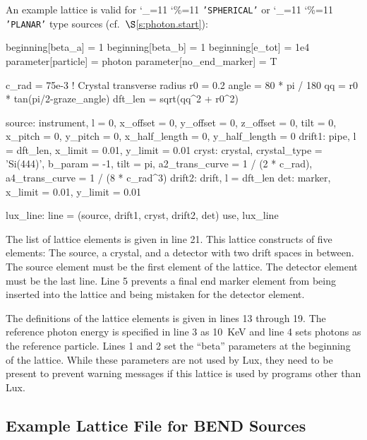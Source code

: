 \documentclass[11pt]{article}
\newcommand{\lux}{Lux\xspace}
\newcommand\ttcmd{\begingroup\catcode`\_=11 \catcode`\%=11 \dottcmd}
\newcommand\dottcmd[1]{\texttt{#1}\endgroup}
\newcommand{\vn}{\ttcmd}
\newcommand{\sref}[1]{$\S$\ref{#1}}
\begin{document}
An example lattice is valid for \vn{'SPHERICAL'} or
\vn{'PLANAR'} type sources (cf.~\sref{s:photon.start}):
\begin{listing}{1}
beginning[beta_a] = 1
beginning[beta_b] = 1
beginning[e_tot] = 1e4
parameter[particle] = photon
parameter[no_end_marker] = T

c_rad = 75e-3  ! Crystal transverse radius 
r0 = 0.2
angle  = 80 * pi / 180
qq = r0 * tan(pi/2-graze_angle)
dft_len = sqrt(qq^2 + r0^2)

source: instrument, l = 0, x_offset = 0, y_offset = 0, z_offset = 0, tilt = 0,
        x_pitch = 0, y_pitch = 0, x_half_length = 0, y_half_length = 0
drift1: pipe, l = dft_len, x_limit = 0.01, y_limit = 0.01
cryst: crystal, crystal_type = 'Si(444)', b_param = -1, tilt = pi, 
        a2_trans_curve = 1 / (2 * c_rad), a4_trans_curve = 1 / (8 * c_rad^3)
drift2: drift, l = dft_len
det: marker, x_limit = 0.01, y_limit = 0.01

lux_line: line = (source, drift1, cryst, drift2, det)
use, lux_line
\end{listing}

The list of lattice elements is given in line 21.  This lattice
constructs of five elements: The source, a crystal, and a detector
with two drift spaces in between. The source element must be the first
element of the lattice. The detector element must be the last
line. Line 5 prevents a final end marker element from being inserted
into the lattice and being mistaken for the detector element.

The definitions of the lattice elements is given in lines 13 through
19.  The reference photon energy is specified in line 3 as 10~KeV and
line 4 sets photons as the reference particle. Lines 1 and 2 set the
``beta'' parameters at the beginning of the lattice. While these
parameters are not used by \lux, they need to be present to prevent
warning messages if this lattice is used by programs other than \lux.

\subsection{Example Lattice File for BEND Sources}
\label{s:bend.lat}
\end{document}
